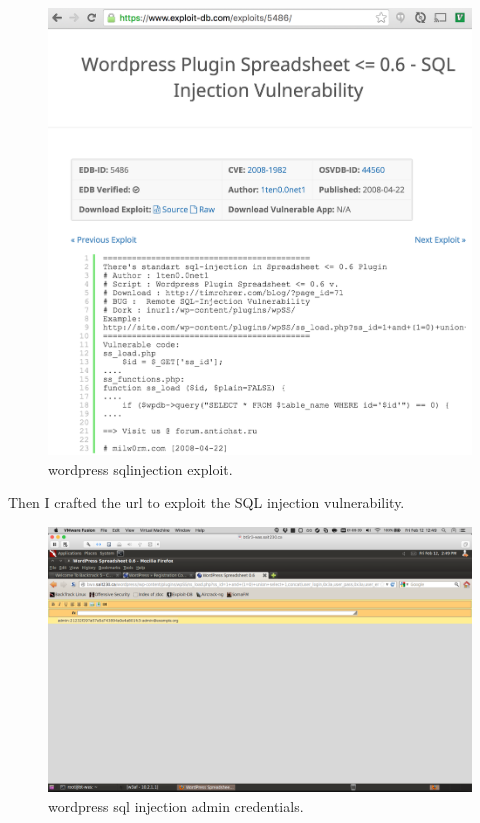 \documentclass{article}
\begin{document}
\begin{figure}[h!]
	\includegraphics[width=\linewidth]{images/wp-exploitdb.png}
	\caption{wordpress sqlinjection exploit.}
	\label{fig:wordpress1}
\end{figure}

Then I crafted the url to exploit the SQL injection vulnerability.

\begin{figure}[h!]
	\includegraphics[width=\linewidth]{images/wp-admin-credentials.png}
	\caption{wordpress sql injection admin credentials.}
	\label{fig:wordpress2}
\end{figure}
\end{document}

